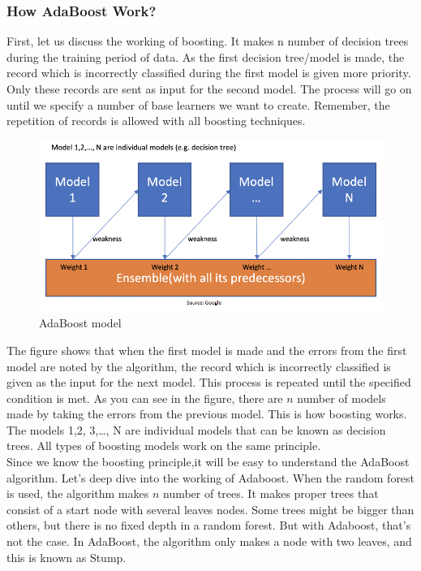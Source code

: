         \subsubsection{How AdaBoost Work?}
        First, let us discuss the working of boosting. It makes n number of decision trees during the training period of data. As the first decision tree/model is made, the record which is incorrectly classified during the first model is given more priority. Only these 
        records are sent as input for the second model. The process will go on until we specify a number of base learners we want to create. Remember, the repetition of records is allowed with all boosting techniques.
        \begin{figure}[H]
            \centering
            \includegraphics[width=0.6\linewidth]{img/adaboost.png}
            \caption{AdaBoost model}
        \end{figure}
        The figure shows that when the first model is made and the errors from the first model are noted by the algorithm, the record which is incorrectly classified is given as the input for the next model. This process is repeated until the specified condition is met. 
        As you can see in the figure, there are $n$ number of models made by taking the errors from the previous model. This is how boosting works. The models 1,2, 3,…, N are individual models that can be known as decision trees. All types of boosting models work on the same principle. \\ 
        \vspace{3mm}
        Since we know the boosting principle,it will be easy to understand the AdaBoost algorithm. Let’s deep dive into the working of Adaboost. When the random forest is used, the algorithm makes $n$ number of trees. It makes proper trees that consist of a start node with several leaves nodes. 
        Some trees might be bigger than others, but there is no fixed depth in a random forest. But with Adaboost, that’s not the case. In AdaBoost, the algorithm only makes a node with two leaves, and this is known as Stump. 
        


